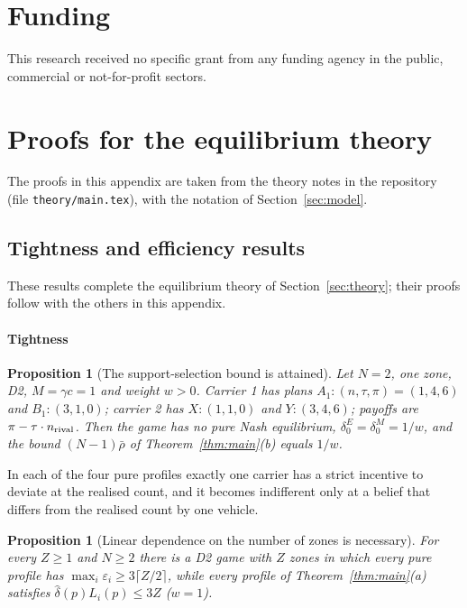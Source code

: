 \documentclass[preprint,12pt]{elsarticle}
\newtheorem{proposition}[theorem]{Proposition}
\theoremstyle{definition}
\theoremstyle{remark}
\begin{document}
\section*{Funding}
This research received no specific grant from any funding agency in the public, commercial or not-for-profit sectors.





\appendix
\section{Proofs for the equilibrium theory}\label{app:proofs}

The proofs in this appendix are taken from the theory notes in the repository (file \texttt{theory/main.tex}), with the notation of Section~\ref{sec:model}.

\subsection{Tightness and efficiency results}\label{app:tightness}

These results complete the equilibrium theory of Section~\ref{sec:theory}; their proofs follow with the others in this appendix.

\paragraph{Tightness}

\begin{proposition}[The support-selection bound is attained]\label{prop:tight}
Let $N=2$, one zone, D2, $M=\gamma c=1$ and weight $w>0$. Carrier 1 has plans $A_1:(n,\tau,\pi)=(1,4,6)$ and $B_1:(3,1,0)$; carrier 2 has $X:(1,1,0)$ and $Y:(3,4,6)$; payoffs are $\pi-\tau\cdot n_{\rm rival}$. Then the game has no pure Nash equilibrium, $\delta_0^E=\delta_0^M=1/w$, and the bound $(N-1)\bar\rho$ of Theorem~\ref{thm:main}(b) equals $1/w$.
\end{proposition}

In each of the four pure profiles exactly one carrier has a strict incentive to deviate at the realised count, and it becomes indifferent only at a belief that differs from the realised count by one vehicle.

\begin{proposition}[Linear dependence on the number of zones is necessary]\label{prop:cycles}
For every $Z\ge1$ and $N\ge2$ there is a D2 game with $Z$ zones in which every pure profile has $\max_i\varepsilon_i\ge3\lceil Z/2\rceil$, while every profile of Theorem~\ref{thm:main}(a) satisfies $\hat\delta(p)L_i(p)\le3Z$ ($w=1$).
\end{proposition}
\end{document}
